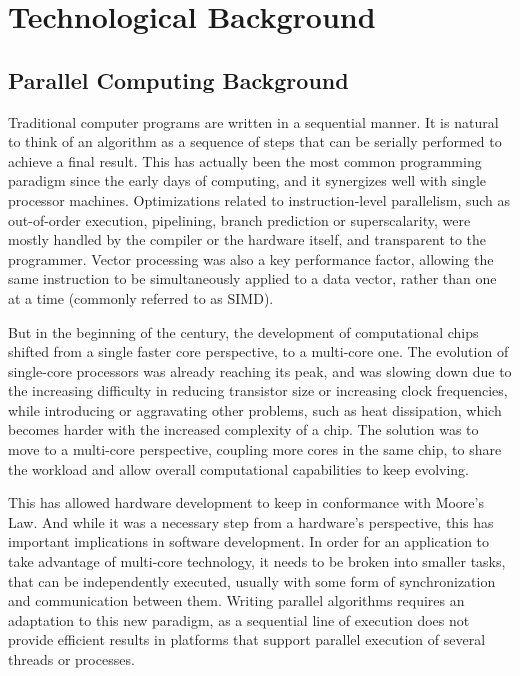 \documentclass[main.tex]{subfiles}
\begin{document}
\chapter{Technological Background} \label{chapter:back}


\section{Parallel Computing Background}

Traditional computer programs are written in a sequential manner. It is natural to think of an algorithm as a sequence of steps that can be serially performed to achieve a final result. This has actually been the most common programming paradigm since the early days of computing, and it synergizes well with single processor machines. Optimizations related to instruction-level parallelism, such as out-of-order execution, pipelining, branch prediction or superscalarity, were mostly handled by the compiler or the hardware itself, and transparent to the programmer. Vector processing was also a key performance factor, allowing the same instruction to be simultaneously applied to a data vector, rather than one at a time (commonly referred to as \ac{SIMD}).

But in the beginning of the  century, the development of computational chips shifted from a single faster core perspective, to a multi-core one. The evolution of single-core processors was already reaching its peak, and was slowing down due to the increasing difficulty in reducing transistor size or increasing clock frequencies, while introducing or aggravating other problems, such as heat dissipation, which becomes harder with the increased complexity of a chip. The solution was to move to a multi-core perspective, coupling more cores in the same chip, to share the workload and allow overall computational capabilities to keep evolving.

This has allowed hardware development to keep in conformance with Moore's Law. And while it was a necessary step from a hardware's perspective, this has important implications in software development. In order for an application to take advantage of multi-core technology, it needs to be broken into smaller tasks, that can be independently executed, usually with some form of synchronization and communication between them. Writing parallel algorithms requires an adaptation to this new paradigm, as a sequential line of execution does not provide efficient results in platforms that support parallel execution of several threads or processes.
\end{document}
